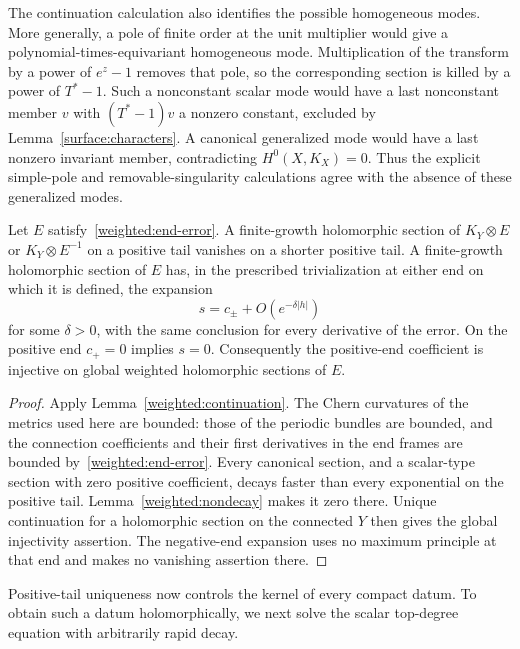 \begin{remark}
The continuation calculation also identifies the possible homogeneous
modes. More generally, a pole of finite order at the unit multiplier
would give a polynomial-times-equivariant homogeneous mode.
Multiplication of the transform by a power of $e^z-1$ removes that
pole, so the corresponding section is killed by a power of $T^*-1$.
Such a nonconstant scalar mode would have a last nonconstant member
$v$ with $(T^*-1)v$ a nonzero constant, excluded by
Lemma~\ref{surface:characters}. A canonical generalized mode would
have a last nonzero invariant member, contradicting $H^0(X,K_X)=0$.
Thus the explicit simple-pole and removable-singularity calculations
agree with the absence of these generalized modes.
\end{remark}

\begin{proposition}\label{weighted:tail}
Let $E$ satisfy~\eqref{weighted:end-error}. A finite-growth holomorphic
section of $K_Y\otimes E$ or $K_Y\otimes E^{-1}$ on a positive tail
vanishes on a shorter positive tail. A finite-growth holomorphic section
of $E$ has, in the prescribed trivialization at either end on which it
is defined, the expansion
\[
 s=c_\pm+O(e^{-\delta |h|})
\]
for some $\delta>0$, with the same conclusion for every derivative of
the error. On the positive end $c_+=0$ implies $s=0$. Consequently the
positive-end coefficient is injective on global weighted holomorphic
sections of $E$.
\end{proposition}

\begin{proof}
Apply Lemma~\ref{weighted:continuation}. The Chern curvatures of the
metrics used here are bounded: those of the periodic bundles are
bounded, and the connection coefficients and their first derivatives in
the end frames are bounded by~\eqref{weighted:end-error}. Every
canonical section, and a scalar-type section with zero positive
coefficient, decays faster than every exponential on the positive
tail. Lemma~\ref{weighted:nondecay} makes it zero there. Unique
continuation for a holomorphic section on the connected $Y$ then gives
the global injectivity assertion. The negative-end expansion uses no
maximum principle at that end and makes no vanishing assertion there.
\end{proof}

Positive-tail uniqueness now controls the kernel of every compact datum.
To obtain such a datum holomorphically, we next solve the scalar
top-degree equation with arbitrarily rapid decay.


